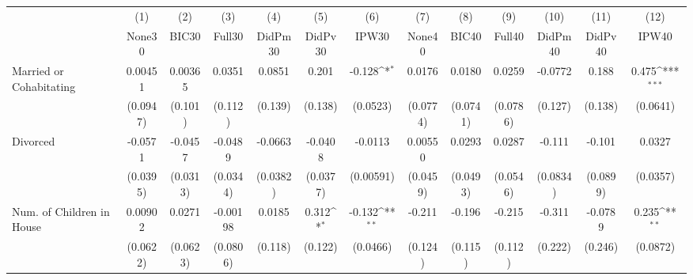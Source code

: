 {
\def\sym#1{\ifmmode^{#1}\else\(^{#1}\)\fi}
\begin{tabular}{l*{12}{c}}
\toprule
            &\multicolumn{1}{c}{(1)}&\multicolumn{1}{c}{(2)}&\multicolumn{1}{c}{(3)}&\multicolumn{1}{c}{(4)}&\multicolumn{1}{c}{(5)}&\multicolumn{1}{c}{(6)}&\multicolumn{1}{c}{(7)}&\multicolumn{1}{c}{(8)}&\multicolumn{1}{c}{(9)}&\multicolumn{1}{c}{(10)}&\multicolumn{1}{c}{(11)}&\multicolumn{1}{c}{(12)}\\
            &\multicolumn{1}{c}{None30}&\multicolumn{1}{c}{BIC30}&\multicolumn{1}{c}{Full30}&\multicolumn{1}{c}{DidPm30}&\multicolumn{1}{c}{DidPv30}&\multicolumn{1}{c}{IPW30}&\multicolumn{1}{c}{None40}&\multicolumn{1}{c}{BIC40}&\multicolumn{1}{c}{Full40}&\multicolumn{1}{c}{DidPm40}&\multicolumn{1}{c}{DidPv40}&\multicolumn{1}{c}{IPW40}\\
\midrule
Married or Cohabitating&     0.00451         &     0.00365         &      0.0351         &      0.0851         &       0.201         &      -0.128\sym{*}  &      0.0176         &      0.0180         &      0.0259         &     -0.0772         &       0.188         &       0.475\sym{***}\\
            &    (0.0947)         &     (0.101)         &     (0.112)         &     (0.139)         &     (0.138)         &    (0.0523)         &    (0.0774)         &    (0.0741)         &    (0.0786)         &     (0.127)         &     (0.138)         &    (0.0641)         \\
\addlinespace
Divorced    &     -0.0571         &     -0.0457         &     -0.0489         &     -0.0663         &     -0.0408         &     -0.0113         &     0.00550         &      0.0293         &      0.0287         &      -0.111         &      -0.101         &      0.0327         \\
            &    (0.0395)         &    (0.0313)         &    (0.0344)         &    (0.0382)         &    (0.0377)         &   (0.00591)         &    (0.0459)         &    (0.0493)         &    (0.0546)         &    (0.0834)         &    (0.0899)         &    (0.0357)         \\
\addlinespace
Num. of Children in House&     0.00902         &      0.0271         &    -0.00198         &      0.0185         &       0.312\sym{*}  &      -0.132\sym{**} &      -0.211         &      -0.196         &      -0.215         &      -0.311         &     -0.0789         &       0.235\sym{**} \\
            &    (0.0622)         &    (0.0623)         &    (0.0806)         &     (0.118)         &     (0.122)         &    (0.0466)         &     (0.124)         &     (0.115)         &     (0.112)         &     (0.222)         &     (0.246)         &    (0.0872)         \\

\end{tabular}}

